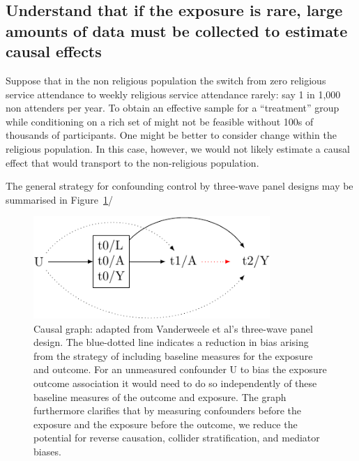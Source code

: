 \documentclass[
  singlecolumn]{report}
\begin{document}
\hypertarget{understand-that-if-the-exposure-is-rare-large-amounts-of-data-must-be-collected-to-estimate-causal-effects}{%
\subsection{\texorpdfstring{\textbf{Understand that if the exposure is
rare, large amounts of data must be collected to estimate causal
effects}}{Understand that if the exposure is rare, large amounts of data must be collected to estimate causal effects}}\label{understand-that-if-the-exposure-is-rare-large-amounts-of-data-must-be-collected-to-estimate-causal-effects}}

Suppose that in the non religious population the switch from zero
religious service attendance to weekly religious service attendance
rarely: say 1 in 1,000 non attenders per year. To obtain an effective
sample for a ``treatment'' group while conditioning on a rich set of
might not be feasible without 100s of thousands of participants. One
might be better to consider change within the religious population. In
this case, however, we would not likely estimate a causal effect that
would transport to the non-religious population.

The general strategy for confounding control by three-wave panel designs
may be summarised in Figure~\ref{fig-dag-6}/

\begin{figure}

{\centering \includegraphics[width=0.8\textwidth,height=\textheight]{causal-dags_files/figure-pdf/fig-dag-6-1.pdf}

}

\caption{\label{fig-dag-6}Causal graph: adapted from Vanderweele et al's
three-wave panel design. The blue-dotted line indicates a reduction in
bias arising from the strategy of including baseline measures for the
exposure and outcome. For an unmeasured confounder U to bias the
exposure outcome association it would need to do so independently of
these baseline measures of the outcome and exposure. The graph
furthermore clarifies that by measuring confounders before the exposure
and the exposure before the outcome, we reduce the potential for reverse
causation, collider stratification, and mediator biases.}

\end{figure}
\end{document}
